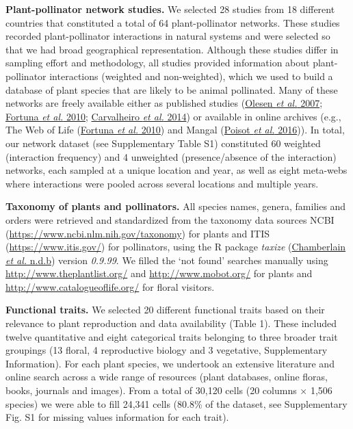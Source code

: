 \documentclass[
  12pt,
  a4paper,
]{article}
\begin{document}
\textbf{Plant-pollinator network studies.} We selected 28 studies from 18 different countries that constituted a total of 64 plant-pollinator networks. These studies recorded plant-pollinator interactions in natural systems and were selected so that we had broad geographical representation. Although these studies differ in sampling effort and methodology, all studies provided information about plant-pollinator interactions (weighted and non-weighted), which we used to build a database of plant species that are likely to be animal pollinated. Many of these networks are freely available either as published studies (\protect\hyperlink{ref-olesen2007}{Olesen \emph{et al.} 2007}; \protect\hyperlink{ref-fortuna2010}{Fortuna \emph{et al.} 2010}; \protect\hyperlink{ref-carvalheiro2014}{Carvalheiro \emph{et al.} 2014}) or available in online archives (e.g., The Web of Life (\protect\hyperlink{ref-fortuna2010}{Fortuna \emph{et al.} 2010}) and Mangal (\protect\hyperlink{ref-poisot2016}{Poisot \emph{et al.} 2016})). In total, our network dataset (see Supplementary Table S1) constituted 60 weighted (interaction frequency) and 4 unweighted (presence/absence of the interaction) networks, each sampled at a unique location and year, as well as eight meta-webs where interactions were pooled across several locations and multiple years.

\textbf{Taxonomy of plants and pollinators.} All species names, genera, families and orders were retrieved and standardized from the taxonomy data sources NCBI (\url{https://www.ncbi.nlm.nih.gov/taxonomy}) for plants and ITIS (\url{https://www.itis.gov/}) for pollinators, using the R package \emph{taxize} (\protect\hyperlink{ref-chamberlain2020}{Chamberlain \emph{et al.} n.d.b}) version \emph{0.9.99}. We filled the `not found' searches manually using \url{http://www.theplantlist.org/} and \url{http://www.mobot.org/} for plants and \url{http://www.catalogueoflife.org/} for floral visitors.

\textbf{Functional traits.} We selected 20 different functional traits based on their relevance to plant reproduction and data availability (Table 1). These included twelve quantitative and eight categorical traits belonging to three broader trait groupings (13 floral, 4 reproductive biology and 3 vegetative, Supplementary Information). For each plant species, we undertook an extensive literature and online search across a wide range of resources (plant databases, online floras, books, journals and images). From a total of 30,120 cells (20 columns × 1,506 species) we were able to fill 24,341 cells (80.8\% of the dataset, see Supplementary Fig. S1 for missing values information for each trait).
\end{document}
